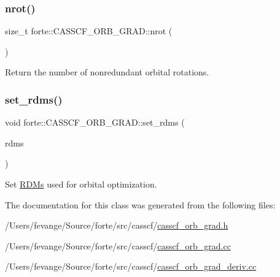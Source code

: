 \subsubsection{\texorpdfstring{nrot()}{nrot()}}
{\footnotesize\ttfamily size\+\_\+t forte\+::\+C\+A\+S\+S\+C\+F\+\_\+\+O\+R\+B\+\_\+\+G\+R\+A\+D\+::nrot (\begin{DoxyParamCaption}{ }\end{DoxyParamCaption})\hspace{0.3cm}{\ttfamily [inline]}}



Return the number of nonredundant orbital rotations. 

\mbox{\label{classforte_1_1_c_a_s_s_c_f___o_r_b___g_r_a_d_a3cab4efed9ba2074faa0f839942643b6}} 
\subsubsection{\texorpdfstring{set\+\_\+rdms()}{set\_rdms()}}
{\footnotesize\ttfamily void forte\+::\+C\+A\+S\+S\+C\+F\+\_\+\+O\+R\+B\+\_\+\+G\+R\+A\+D\+::set\+\_\+rdms (\begin{DoxyParamCaption}\item[{\mbox{\hyperlink{classforte_1_1_r_d_ms}{R\+D\+Ms}} \&}]{rdms }\end{DoxyParamCaption})}



Set \mbox{\hyperlink{classforte_1_1_r_d_ms}{R\+D\+Ms}} used for orbital optimization. 



The documentation for this class was generated from the following files\+:\begin{DoxyCompactItemize}
\item 
/\+Users/fevange/\+Source/forte/src/casscf/\mbox{\hyperlink{casscf__orb__grad_8h}{casscf\+\_\+orb\+\_\+grad.\+h}}\item 
/\+Users/fevange/\+Source/forte/src/casscf/\mbox{\hyperlink{casscf__orb__grad_8cc}{casscf\+\_\+orb\+\_\+grad.\+cc}}\item 
/\+Users/fevange/\+Source/forte/src/casscf/\mbox{\hyperlink{casscf__orb__grad__deriv_8cc}{casscf\+\_\+orb\+\_\+grad\+\_\+deriv.\+cc}}\end{DoxyCompactItemize}
